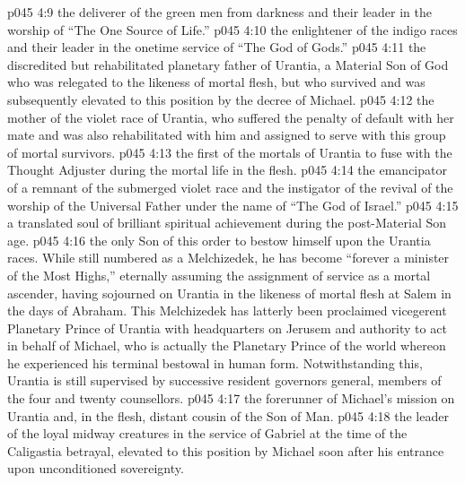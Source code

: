 \vs p045 4:9 \bibnobreakspace {} the deliverer of the green men from darkness and their leader in the worship of “The One Source of Life.”
\vs p045 4:10 \bibnobreakspace {} the enlightener of the indigo races and their leader in the onetime service of “The God of Gods.”
\vs p045 4:11 \bibnobreakspace {} the discredited but rehabilitated planetary father of Urantia, a Material Son of God who was relegated to the likeness of mortal flesh, but who survived and was subsequently elevated to this position by the decree of Michael.
\vs p045 4:12 \bibnobreakspace {} the mother of the violet race of Urantia, who suffered the penalty of default with her mate and was also rehabilitated with him and assigned to serve with this group of mortal survivors.
\vs p045 4:13 \bibnobreakspace {} the first of the mortals of Urantia to fuse with the Thought Adjuster during the mortal life in the flesh.
\vs p045 4:14 \bibnobreakspace {} the emancipator of a remnant of the submerged violet race and the instigator of the revival of the worship of the Universal Father under the name of “The God of Israel.”
\vs p045 4:15 \bibnobreakspace {} a translated soul of brilliant spiritual achievement during the post\hyp{}Material Son age.
\vs p045 4:16 \bibnobreakspace {} the only Son of this order to bestow himself upon the Urantia races. While still numbered as a Melchizedek, he has become “forever a minister of the Most Highs,” eternally assuming the assignment of service as a mortal ascender, having sojourned on Urantia in the likeness of mortal flesh at Salem in the days of Abraham. This Melchizedek has latterly been proclaimed vicegerent Planetary Prince of Urantia with headquarters on Jerusem and authority to act in behalf of Michael, who is actually the Planetary Prince of the world whereon he experienced his terminal bestowal in human form. Notwithstanding this, Urantia is still supervised by successive resident governors general, members of the four and twenty counsellors.
\vs p045 4:17 \bibnobreakspace {} the forerunner of Michael’s mission on Urantia and, in the flesh, distant cousin of the Son of Man.
\vs p045 4:18 \bibnobreakspace {} the leader of the loyal midway creatures in the service of Gabriel at the time of the Caligastia betrayal, elevated to this position by Michael soon after his entrance upon unconditioned sovereignty.
